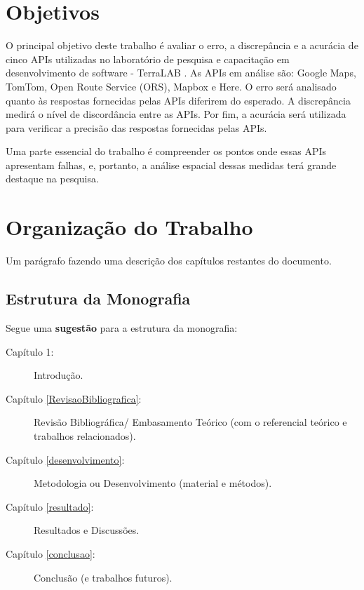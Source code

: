 \section{Objetivos}

O principal objetivo deste trabalho é avaliar o erro, a discrepância e a acurácia de cinco APIs utilizadas no laboratório de pesquisa e capacitação em desenvolvimento de software - TerraLAB \cite{terralab}. As APIs em análise são: Google Maps, TomTom, Open Route Service (ORS), Mapbox e Here. O erro será analisado quanto às respostas fornecidas pelas APIs diferirem do esperado. A discrepância medirá o nível de discordância entre as APIs. Por fim, a acurácia será utilizada para verificar a precisão das respostas fornecidas pelas APIs.

Uma parte essencial do trabalho é compreender os pontos onde essas APIs apresentam falhas, e, portanto, a análise espacial dessas medidas terá grande destaque na pesquisa.

\section{Organização do Trabalho}

Um parágrafo fazendo uma descrição dos capítulos restantes do documento. 

\subsection{Estrutura da Monografia}

Segue uma \textbf{sugestão} para a estrutura da monografia: 

\begin{description}
   \item[Capítulo 1:] Introdução.
   \item[Capítulo \ref{RevisaoBibliografica}:] Revisão Bibliográfica/ Embasamento Teórico (com o referencial teórico e trabalhos relacionados).
   \item[Capítulo \ref{desenvolvimento}:] Metodologia ou Desenvolvimento (material e métodos).
   \item[Capítulo \ref{resultado}:] Resultados e Discussões.
   \item[Capítulo \ref{conclusao}:] Conclusão (e trabalhos futuros).
\end{description}


 









